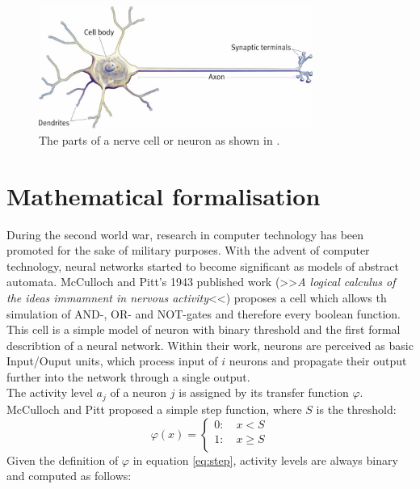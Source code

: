 \documentclass[10pt,a4paper,DIV=11]{scrreprt}
\begin{document}
\begin{center}
\begin{figure}
\includegraphics[width=0.8\textwidth,scale=1]{files/neuron.jpg}  
\caption{The parts of a nerve cell or neuron as shown in \cite{NEU}.}
\label{fig:neuron}
\end{figure}
\end{center}


\section{Mathematical formalisation}\label{sec:mcpitts}
During the second world war, research in computer technology has been promoted for the sake of military purposes. With the advent of computer technology, neural networks started to become significant as models of abstract automata. McCulloch and Pitt's 1943 published work (>>\textit{A logical calculus of the ideas immamnent in nervous activity}<<) proposes a cell which allows th simulation of AND-, OR- and NOT-gates and therefore every boolean function. This cell is a simple model of neuron with binary threshold and the first formal describtion of a neural network. Within their work, neurons are perceived as basic Input/Ouput units, which process input of $i$ neurons and propagate their output further into the network through a single output.\\

The activity level $a_j$ of a neuron $j$ is assigned by its transfer function $\varphi$. McCulloch and Pitt proposed a simple step function, where $S$ is the threshold:\\

\begin{equation}
	\varphi(x)=\begin{cases}
		0: \quad  x < S \\
		1: \quad  x \geq S \\
	\end{cases}
\label{eq:step}
\end{equation}
Given the definition of $\varphi$ in equation \eqref{eq:step}, activity levels are always binary and computed as follows:\\
\end{document}

